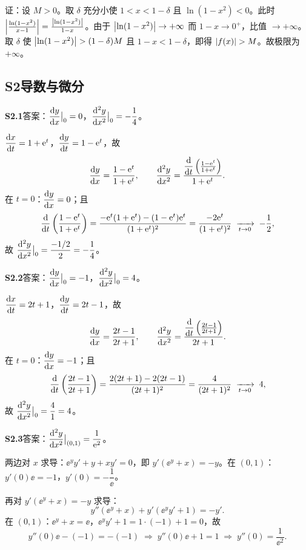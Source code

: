 证：设 $M>0$。取 $\delta$ 充分小使 $1<x<1-\delta$ 且 $\ln(1-x^{2})<0$。此时 $\left\lvert \frac{\ln(1-x^{2})}{x-1}\right\rvert=\frac{\left\lvert \ln(1-x^{2})\right\rvert}{1-x}$。由于 $\left\lvert \ln(1-x^{2})\right\rvert\to+\infty$ 而 $1-x\to0^{+}$，比值 $\to+\infty$。取 $\delta$ 使 $\left\lvert \ln(1-x^{2})\right\rvert>(1-\delta)M$ 且 $1-x<1-\delta$，即得 $\left\lvert f(x)\right\rvert>M$。故极限为 $+\infty$。

\subsection{S2\quad 导数与微分}

\noindent\textbf{S2.1}\quad 答案：$\dfrac{\mathrm{d} y}{\mathrm{d} x}\big|_{0}=0$，$\dfrac{\mathrm{d}^{2}y}{\mathrm{d} x^{2}}\big|_{0}=-\dfrac{1}{4}$。

$\dfrac{\mathrm{d} x}{\mathrm{d} t}=1+\mathrm{e}^{t}$，$\dfrac{\mathrm{d} y}{\mathrm{d} t}=1-\mathrm{e}^{t}$，故
\[
\frac{\mathrm{d} y}{\mathrm{d} x}=\frac{1-\mathrm{e}^{t}}{1+\mathrm{e}^{t}},\qquad
\frac{\mathrm{d}^{2}y}{\mathrm{d} x^{2}}=\frac{\dfrac{\mathrm{d}}{\mathrm{d} t}\left(\frac{1-\mathrm{e}^{t}}{1+\mathrm{e}^{t}}\right)}{1+\mathrm{e}^{t}}.
\]
在 $t=0$：$\dfrac{\mathrm{d} y}{\mathrm{d} x}=0$；且
\[
\frac{\mathrm{d}}{\mathrm{d} t}\left(\frac{1-\mathrm{e}^{t}}{1+\mathrm{e}^{t}}\right)
=\frac{-\mathrm{e}^{t}(1+\mathrm{e}^{t})-(1-\mathrm{e}^{t})\mathrm{e}^{t}}{(1+\mathrm{e}^{t})^{2}}
=\frac{-2\mathrm{e}^{t}}{(1+\mathrm{e}^{t})^{2}}\;\xrightarrow[t\to0]{}\;-\frac12,
\]
故 $\dfrac{\mathrm{d}^{2}y}{\mathrm{d} x^{2}}\big|_{0}=\dfrac{-1/2}{2}=-\dfrac{1}{4}$。

\medskip
\noindent\textbf{S2.2}\quad 答案：$\dfrac{\mathrm{d} y}{\mathrm{d} x}\big|_{0}=-1$，$\dfrac{\mathrm{d}^{2}y}{\mathrm{d} x^{2}}\big|_{0}=4$。

$\dfrac{\mathrm{d} x}{\mathrm{d} t}=2t+1$，$\dfrac{\mathrm{d} y}{\mathrm{d} t}=2t-1$，故
\[
\frac{\mathrm{d} y}{\mathrm{d} x}=\frac{2t-1}{2t+1},\qquad
\frac{\mathrm{d}^{2}y}{\mathrm{d} x^{2}}=\frac{\dfrac{\mathrm{d}}{\mathrm{d} t}\left(\frac{2t-1}{2t+1}\right)}{2t+1}.
\]
在 $t=0$：$\dfrac{\mathrm{d} y}{\mathrm{d} x}=-1$；且
\[
\frac{\mathrm{d}}{\mathrm{d} t}\left(\frac{2t-1}{2t+1}\right)
=\frac{2(2t+1)-2(2t-1)}{(2t+1)^{2}}=\frac{4}{(2t+1)^{2}}\;\xrightarrow[t\to0]{}\;4,
\]
故 $\dfrac{\mathrm{d}^{2}y}{\mathrm{d} x^{2}}\big|_{0}=\dfrac{4}{1}=4$。

\medskip
\noindent\textbf{S2.3}\quad 答案：$\dfrac{\mathrm{d}^{2}y}{\mathrm{d} x^{2}}\big|_{(0,1)}=\dfrac{1}{\mathrm{e}^{2}}$。

两边对 $x$ 求导：$\ee^{y}y'+y+xy'=0$，即 $y'(\ee^{y}+x)=-y$。在 $(0,1)$：$y'(0)\ee=-1$，$y'(0)=-\dfrac{1}{\ee}$。

再对 $y'(\ee^{y}+x)=-y$ 求导：
\[
y''(\ee^{y}+x)+y'(\ee^{y}y'+1)=-y'.
\]
在 $(0,1)$：$\ee^{y}+x=\ee$，$\ee^{y}y'+1=1\cdot(-1)+1=0$，故
\[
y''(0)\ee-(-1)=-(-1)\;\Longrightarrow\;y''(0)\ee+1=1\;\Longrightarrow\;y''(0)=\frac{1}{\ee^{2}}.
\]

